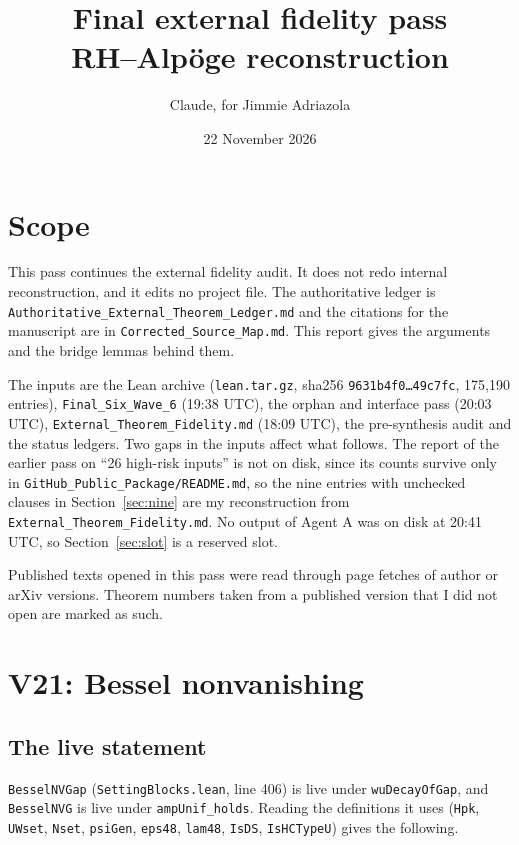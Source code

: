 \documentclass[11pt]{article}
\title{Final external fidelity pass\\[2pt]\large RH--Alpöge reconstruction}
\author{Claude, for Jimmie Adriazola}
\date{22 November 2026}
\newcommand{\lean}[1]{\nolinkurl{#1}}
\theoremstyle{definition}
\begin{document}
\maketitle

\section{Scope}

This pass continues the external fidelity audit. It does not redo internal reconstruction, and it edits no project file. The authoritative ledger is \texttt{Authoritative\_External\_Theorem\_Ledger.md} and the citations for the manuscript are in \texttt{Corrected\_Source\_Map.md}. This report gives the arguments and the bridge lemmas behind them.

The inputs are the Lean archive (\texttt{lean.tar.gz}, sha256 \texttt{9631b4f0\dots49c7fc}, 175{,}190 entries), \texttt{Final\_Six\_Wave\_6} (19:38 UTC), the orphan and interface pass (20:03 UTC), \texttt{External\_Theorem\_Fidelity.md} (18:09 UTC), the pre-synthesis audit and the status ledgers. Two gaps in the inputs affect what follows. The report of the earlier pass on ``26 high-risk inputs'' is not on disk, since its counts survive only in \texttt{GitHub\_Public\_Package/README.md}, so the nine entries with unchecked clauses in Section~\ref{sec:nine} are my reconstruction from \texttt{External\_Theorem\_Fidelity.md}. No output of Agent A was on disk at 20:41 UTC, so Section~\ref{sec:slot} is a reserved slot.

Published texts opened in this pass were read through page fetches of author or arXiv versions. Theorem numbers taken from a published version that I did not open are marked as such.

\section{V21: Bessel nonvanishing}\label{sec:v21}

\subsection{The live statement}

\lean{BesselNVGap} (\lean{SettingBlocks.lean}, line 406) is live under \lean{wuDecayOfGap}, and \lean{BesselNVG} is live under \lean{ampUnif_holds}. Reading the definitions it uses (\lean{Hpk}, \lean{UWset}, \lean{Nset}, \lean{psiGen}, \lean{eps48}, \lean{lam48}, \lean{IsDS}, \lean{IsHCTypeU}) gives the following.
\end{document}
